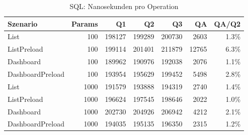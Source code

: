 \begin{table}[ht]
\centering
\caption{SQL: Nanosekunden pro Operation}
\begin{tabular}{lrrrrrr}
\toprule
Szenario & Params & Q1 & Q2 & Q3 & QA & QA/Q2 \\
\midrule
		List & 100 & 198127 & 199289 & 200730 & 2603 & 1.3\% \\
		ListPreload & 100 & 199114 & 201401 & 211879 & 12765 & 6.3\% \\
		Dashboard & 100 & 189962 & 190976 & 192038 & 2076 & 1.1\% \\
		DashboardPreload & 100 & 193954 & 195629 & 199452 & 5498 & 2.8\% \\
		List & 1000 & 191579 & 193888 & 194319 & 2740 & 1.4\% \\
		ListPreload & 1000 & 196624 & 197545 & 198646 & 2022 & 1.0\% \\
		Dashboard & 1000 & 202730 & 204926 & 206942 & 4212 & 2.1\% \\
		DashboardPreload & 1000 & 194035 & 195135 & 196350 & 2315 & 1.2\% \\
\bottomrule
\end{tabular}
\label{tab:benchmark_sql_nsperop}
\end{table}
	